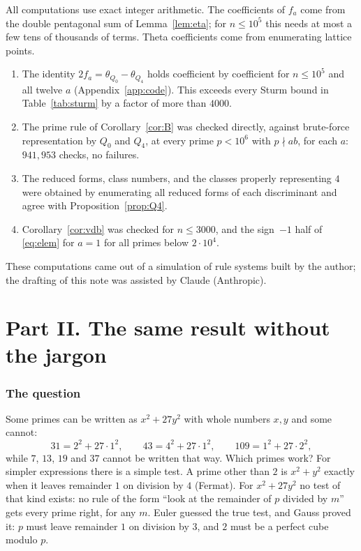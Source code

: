 \documentclass[11pt]{amsart}
\theoremstyle{definition}
\theoremstyle{remark}
\begin{document}
All computations use exact integer arithmetic. The coefficients of $f_a$ come from the double pentagonal sum of Lemma~\ref{lem:eta}; for $n\le10^5$ this needs at most a few tens of thousands of terms. Theta coefficients come from enumerating lattice points.
\begin{enumerate}
\item The identity $2f_a=\theta_{Q_0}-\theta_{Q_4}$ holds coefficient by coefficient for $n\le10^5$ and all twelve $a$ (Appendix~\ref{app:code}). This exceeds every Sturm bound in Table~\ref{tab:sturm} by a factor of more than $4000$.
\item The prime rule of Corollary~\ref{cor:B} was checked directly, against brute-force representation by $Q_0$ and $Q_4$, at every prime $p<10^6$ with $p\nmid ab$, for each $a$: $941{,}953$ checks, no failures.
\item The reduced forms, class numbers, and the classes properly representing $4$ were obtained by enumerating all reduced forms of each discriminant and agree with Proposition~\ref{prop:Q4}.
\item Corollary~\ref{cor:vdb} was checked for $n\le3000$, and the sign~$-1$ half of \eqref{eq:elem} for $a=1$ for all primes below $2\cdot10^4$.
\end{enumerate}
These computations came out of a simulation of rule systems built by the author; the drafting of this note was assisted by Claude (Anthropic).

\part*{Part II. The same result without the jargon}

\section{The question}

Some primes can be written as $x^2+27y^2$ with whole numbers $x,y$ and some cannot:
\[
31=2^2+27\cdot1^2,\qquad 43=4^2+27\cdot1^2,\qquad 109=1^2+27\cdot2^2,
\]
while $7$, $13$, $19$ and $37$ cannot be written that way. Which primes work? For simpler expressions there is a simple test. A prime other than $2$ is $x^2+y^2$ exactly when it leaves remainder $1$ on division by $4$ (Fermat). For $x^2+27y^2$ no test of that kind exists: no rule of the form ``look at the remainder of $p$ divided by $m$'' gets every prime right, for any $m$. Euler guessed the true test, and Gauss proved it: $p$ must leave remainder $1$ on division by $3$, and $2$ must be a perfect cube modulo $p$.
\end{document}

